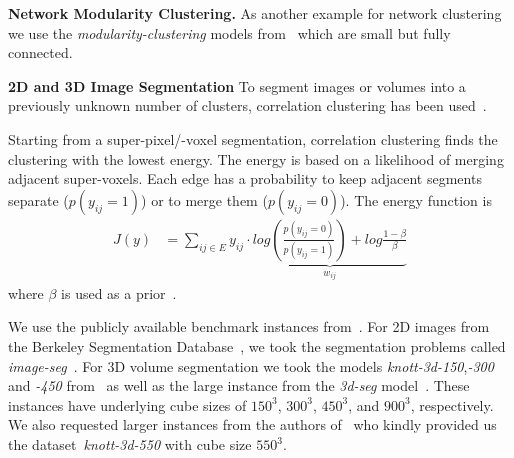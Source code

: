 \textbf{Network Modularity Clustering.}
As another example for network clustering we use the \emph{modularity-clustering} models from~\cite{kappes_2014_benchmark_arxiv} which are small but fully connected.

\textbf{2D and 3D Image Segmentation}\label{sec:imseg}
To segment images or volumes into a previously
unknown number of clusters, correlation clustering
has been used~\cite{andres_2011_iccv,kroeger_2012_eccv}.

Starting from a super-pixel/-voxel segmentation,
correlation clustering finds the clustering with the lowest energy.
The energy is based on a likelihood of merging adjacent super-voxels.
Each edge has a probability to keep adjacent segments separate ($p(y_{ij} =1)$)
or to merge them ($p(y_{ij} = 0)$).
The energy function is
\begin{align}
 J(y)  &= \sum_{ij \in E} y_{ij}\cdot \underbrace{  log\left( \frac{p(y_{ij} =0)}{p(y_{ij} =1)}\right) + log \frac{1-\beta}{\beta}  }_{w_{ij}}
\end{align}
where $\beta$ is used as a prior~\cite{andres_2011_iccv}.

We use the publicly available benchmark instances from~\cite{kappes_2013_benchmark_cvpr,kappes_2014_benchmark_arxiv}.
For 2D images from the Berkeley Segmentation Database~\cite{martin_2001}, we took the segmentation problems called \emph{image-seg}~\cite{andres_2011_iccv,kappes_2013_benchmark_cvpr}.
For 3D volume segmentation we took the models \emph{knott-3d-150},\emph{-300} and \emph{-450} from~\cite{kroeger_2012_eccv,kappes_2014_benchmark_arxiv} as well as the large
instance from the \emph{3d-seg} model~\cite{andres_2011_iccv,kappes_2013_benchmark_cvpr}. These instances have underlying cube sizes of  $150^3$, $300^3$, $450^3$, and $900^3$, respectively.
We also requested larger instances from the authors of~\cite{kroeger_2012_eccv} who kindly provided us the dataset~\emph{knott-3d-550} with cube size  $550^3$.
